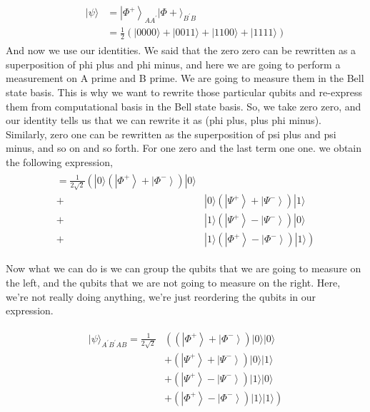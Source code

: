 \begin{align}
    \begin{aligned}
|\psi\rangle &=\left|\Phi^{+}\right\rangle_{A A^{\prime}}|\Phi+\rangle_{B^{\prime} B} \\
&=\frac{1}{2}(|0000\rangle+|0011\rangle+|1100\rangle+|1111\rangle)
\end{aligned}
\end{align}
And now we use our identities. We said that the zero zero can be rewritten as a superposition of phi plus and phi minus, and here we are going to perform a measurement on A prime and B prime. We are going to measure them in the Bell state basis. This is why we want to rewrite those particular qubits and re-express them from computational basis in the Bell state basis. So, we take zero zero, and our identity tells us that we can rewrite it as (phi plus, plus phi minus). Similarly, zero one can be rewritten as the superposition of psi plus and psi minus, and so on and so forth. For one zero and the last term one one. we obtain the following expression,
\begin{align}
    \begin{array}{ll}
=\frac{1}{2 \sqrt{2}}\left(|0\rangle\left(\left|\Phi^{+}\right\rangle+\left|\Phi^{-}\right\rangle\right)|0\rangle\right. \\
+ & |0\rangle\left(\left|\Psi^{+}\right\rangle+\left|\Psi^{-}\right\rangle\right)|1\rangle \\
+ & |1\rangle\left(\left|\Psi^{+}\right\rangle-\left|\Psi^{-}\right\rangle\right)|0\rangle \\
+ & \left.|1\rangle\left(\left|\Phi^{+}\right\rangle-\left|\Phi^{-}\right\rangle\right)|1\rangle\right)
\end{array}
\end{align}

Now what we can do is we can group the qubits that we are going to measure on the left, and the qubits that we are not going to measure on the right. Here, we're not really doing anything, we're just reordering the qubits in our expression. 

\begin{align}
        \begin{aligned}
|\psi\rangle_{A^{\prime} B^{\prime} A B}=\frac{1}{2 \sqrt{2}} &\left(\left(\left|\Phi^{+}\right\rangle+\left|\Phi^{-}\right\rangle\right)|0\rangle|0\rangle\right.\\
&+\left(\left|\Psi^{+}\right\rangle+\left|\Psi^{-}\right\rangle\right)|0\rangle|1\rangle \\
&+\left(\left|\Psi^{+}\right\rangle-\left|\Psi^{-}\right\rangle\right)|1\rangle|0\rangle \\
&\left.+\left(\left|\Phi^{+}\right\rangle-\left|\Phi^{-}\right\rangle\right)|1\rangle|1\rangle\right)
\end{aligned}
\end{align}

